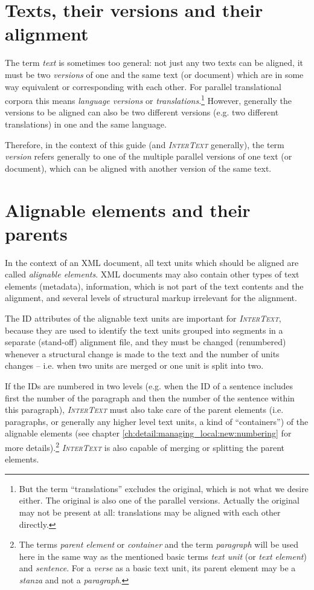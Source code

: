 \documentclass[a4paper,10pt,oneside]{book}
\newcommand{\IT}{\textit{\textsc{InterText}}\xspace}
\begin{document}
\section{Texts, their versions and their alignment}\label{ch:intro:albasics:textversions}

The term \emph{text} is sometimes too general: not just any two texts can be aligned, it must be two \emph{versions} of one and the same text (or document) which are in some way equivalent or corresponding with each other. For parallel translational corpora this means \emph{language versions} or \emph{translations}.\footnote{But the term ``translations'' excludes the original, which is not what we desire either. The original is also one of the parallel versions. Actually the original may not be present at all: translations may be aligned with each other directly.} However, generally the versions to be aligned can also be two different versions (e.g. two different translations) in one and the same language.

Therefore, in the context of this guide (and \IT generally), the term \emph{version} refers generally to one of the multiple parallel versions of one text (or document), which can be aligned with another version of the same text.

\section{Alignable elements and their parents}\label{ch:intro:albasics:alignable}

In the context of an XML document, all text units which should be aligned are called \emph{alignable elements}. XML documents may also contain other types of text elements (metadata), information, which is not part of the text contents and the alignment, and several levels of structural markup irrelevant for the alignment.

The ID attributes of the alignable text units are important for \IT, because they are used to identify the text units grouped into segments in a separate (stand-off) alignment file, and they must be changed (renumbered) whenever a structural change is made to the text and the number of units changes -- i.e. when two units are merged or one unit is split into two. 

If the IDs are numbered in two levels (e.g. when the ID of a sentence includes first the number of the paragraph and then the number of the sentence within this paragraph), \IT must also take care of the parent elements (i.e. paragraphs, or generally any higher level text units, a kind of ``containers'') of the alignable elements (see chapter \ref{ch:detail:managing_local:new:numbering} for more details).\footnote{The terms \emph{parent element} or \emph{container} and the term \emph{paragraph} will be used here in the same way as the mentioned basic terms \emph{text unit} (or \emph{text element}) and \emph{sentence}. For a \emph{verse} as a basic text unit, its parent element may be a \emph{stanza} and not a \emph{paragraph}.} \IT is also capable of merging or splitting the parent elements.
\end{document}
